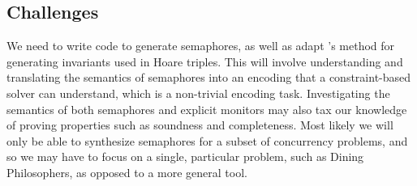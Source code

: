 \subsection{Challenges}
We need to write code to generate semaphores, as well as adapt \cite{ferles2018}’s method for generating invariants used in Hoare triples. This will involve understanding and translating the semantics of semaphores into an encoding that a constraint-based solver can understand, which is a non-trivial encoding task. Investigating the semantics of both semaphores and explicit monitors may also tax our knowledge of proving properties such as soundness and completeness.  Most likely we will only be able to synthesize semaphores for a subset of concurrency problems, and so we may have to focus on a single, particular problem, such as Dining Philosophers, as opposed to a more general tool.

